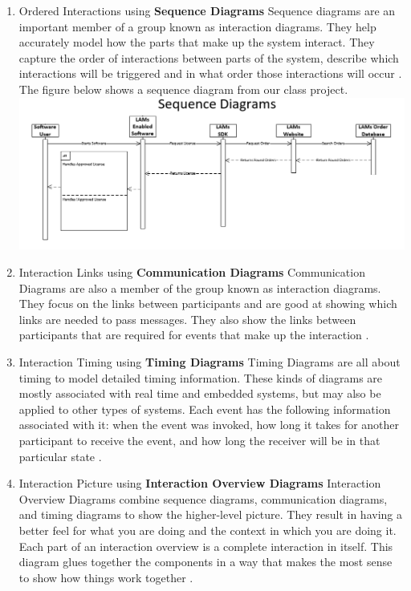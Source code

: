 \documentclass{acm_proc_article-sp}
\begin{document}
\begin{enumerate}
	\item Ordered Interactions using \textbf{Sequence Diagrams}
	\newline
	Sequence diagrams are an important member of a group known as interaction diagrams. They help accurately model how the parts that make up the system interact.  They capture the order of interactions between parts of the system, describe which interactions will be triggered and in what order those interactions will occur \cite{Lamport:UML}.
	\newline
	The figure below shows a sequence diagram from our class project.
	\newline
	\includegraphics[scale=0.3]{SequenceDiagram}
	\item Interaction Links using \textbf{Communication Diagrams}
	\newline
	Communication Diagrams are also a member of the group known as interaction diagrams. They focus on the links between participants and are good at showing which links are needed to pass messages. They also show the links between participants that are required for events that make up the interaction \cite{Lamport:UML}.
	\item Interaction Timing using \textbf{Timing Diagrams} 
	\newline
	Timing Diagrams are all about timing to model detailed timing information. These kinds of diagrams are mostly associated with real time and embedded systems, but may also be applied to other types of systems. Each event has the following information associated with it: when the event was invoked, how long it takes for another participant to receive the event, and how long the receiver will be in that particular state \cite{Lamport:UML}.
	\item Interaction Picture using \textbf{Interaction Overview Diagrams}
	\newline
	Interaction Overview Diagrams combine sequence diagrams, communication diagrams, and timing diagrams to show the higher-level picture. They result in having a better feel for what you are doing and the context in which you are doing it. Each part of an interaction overview is a complete interaction in itself. This diagram glues together the components in a way that makes the most sense to show how things work together \cite{Lamport:UML}.

\end{enumerate}
\end{document}
